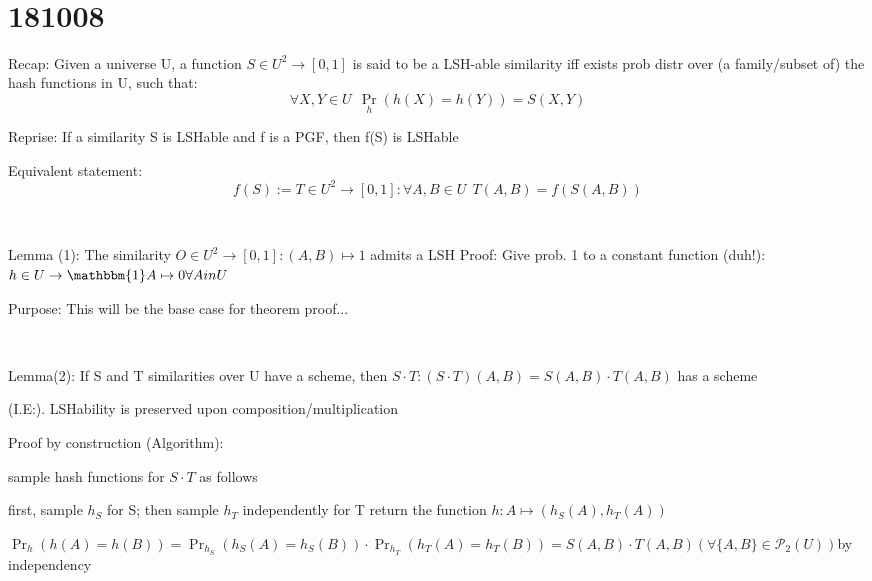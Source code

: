 \documentclass{report}
\begin{document}
	
	\
	
	\section{181008}
	
	
	
	Recap: Given a universe U, a function $S \in U^2 \to [0, 1]$ is said to be a LSH-able similarity iff exists prob distr over (a family/subset of) the hash functions in U, such that: 
	\begin{equation}
	\forall X, Y \in U\ \ \Pr_h(h(X)=h(Y)) = S(X, Y)
	\end{equation}
	
	
	Reprise: If a similarity S is LSHable and f is a PGF, then f(S) is LSHable
	
	Equivalent statement:
	\begin{equation}
	f(S) := T \in U^2 \to [0, 1] : \forall A, B \in U\ \ T(A, B) = f(S(A, B))
	\end{equation}
	
	
	
	
	\
	
	Lemma (1): The similarity $O \in U^2 \to [0, 1] : (A, B) \mapsto 1$ admits a LSH
	Proof: Give prob. 1 to a constant function (duh!): $h \in U \to \mathbbm{1} A \mapsto 0 \forall A in U$
	
	Purpose: This will be the base case for theorem proof...
	
	
	\
	
	Lemma(2): If S and T similarities over U have a scheme, then $S \cdot T : (S \cdot T)(A, B) = S(A, B)\cdot T(A, B)$ has a scheme
	
	(I.E:). LSHability is preserved upon composition/multiplication
	
	Proof by construction (Algorithm): 
	
	sample hash functions for $S \cdot T$ as follows
	
	first, sample $h_S$ for S;
	then sample $h_T$ independently for T
	return the function $h : A \mapsto (h_S(A), h_T(A))$
	
	$\Pr_h(h(A)=h(B)) = \Pr_{h_S}(h_S(A)=h_S(B)) \cdot \Pr_{h_T}(h_T(A)=h_T(B)) = S(A, B) \cdot T(A, B) (\forall \{A, B\} \in \mathcal{P}_2(U))$by independency
	
\end{document}
